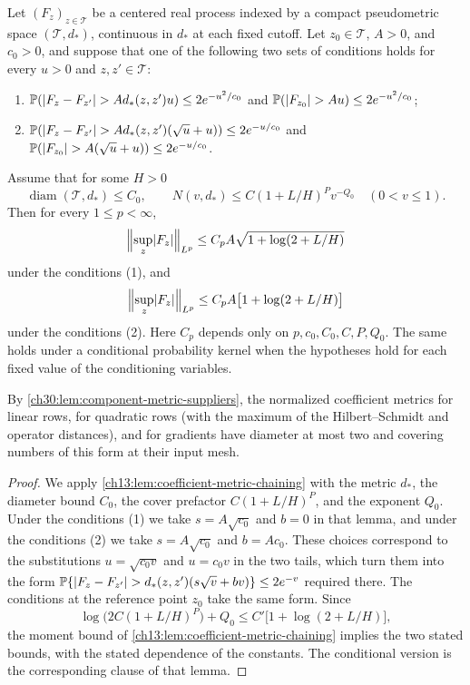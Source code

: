 \begin{lemma}\label{ch30:lem:anchored-chaining}
Let $(F_z)_{z\in\mathcal T}$ be a centered real process indexed by a compact pseudometric space $(\mathcal T,d_*)$, continuous in $d_*$ at each fixed cutoff. Let $z_0\in\mathcal T$, $A>0$, and $c_0>0$, and suppose that one of the following two sets of conditions holds for every $u>0$ and $z,z'\in\mathcal T$:
\begin{enumerate}
\item $\mathbb P(\lvert F_z-F_{z'}\rvert>Ad_*(z,z')u)\le2e^{-u^2/c_0}$ and $\mathbb P(\lvert F_{z_0}\rvert>Au)\le2e^{-u^2/c_0}$;
\item $\mathbb P(\lvert F_z-F_{z'}\rvert>Ad_*(z,z')(\sqrt u+u))\le2e^{-u/c_0}$ and $\mathbb P(\lvert F_{z_0}\rvert>A(\sqrt u+u))\le2e^{-u/c_0}$.
\end{enumerate}
Assume that for some $H>0$
\[
 \operatorname{diam}(\mathcal T,d_*)\le C_0,\qquad N(v,d_*)\le C(1+L/H)^Pv^{-Q_0}\quad(0<v\le1).
\]
Then for every $1\le p<\infty$,
\[
 \Bigl\lVert\sup_z\lvert F_z\rvert\Bigr\rVert_{L^p}\le C_pA\sqrt{1+\log(2+L/H)}
\]
under the conditions (1), and
\[
 \Bigl\lVert\sup_z\lvert F_z\rvert\Bigr\rVert_{L^p}\le C_pA\bigl[1+\log(2+L/H)\bigr]
\]
under the conditions (2). Here $C_p$ depends only on $p,c_0,C_0,C,P,Q_0$. The same holds under a conditional probability kernel when the hypotheses hold for each fixed value of the conditioning variables.
\end{lemma}

By \cref{ch30:lem:component-metric-suppliers}, the normalized coefficient metrics for linear rows, for quadratic rows (with the maximum of the Hilbert--Schmidt and operator distances), and for gradients have diameter at most two and covering numbers of this form at their input mesh.

\begin{proof}
We apply \cref{ch13:lem:coefficient-metric-chaining} with the metric $d_*$, the diameter bound $C_0$, the cover prefactor $C(1+L/H)^P$, and the exponent $Q_0$. Under the conditions (1) we take $s=A\sqrt{c_0}$ and $b=0$ in that lemma, and under the conditions (2) we take $s=A\sqrt{c_0}$ and $b=Ac_0$. These choices correspond to the substitutions $u=\sqrt{c_0v}$ and $u=c_0v$ in the two tails, which turn them into the form $\mathbb P\{\lvert F_z-F_{z'}\rvert>d_*(z,z')(s\sqrt v+bv)\}\le2e^{-v}$ required there. The conditions at the reference point $z_0$ take the same form. Since
\[
 \log\bigl(2C(1+L/H)^P\bigr)+Q_0\le C'\bigl[1+\log(2+L/H)\bigr],
\]
the moment bound of \cref{ch13:lem:coefficient-metric-chaining} implies the two stated bounds, with the stated dependence of the constants. The conditional version is the corresponding clause of that lemma.
\end{proof}

